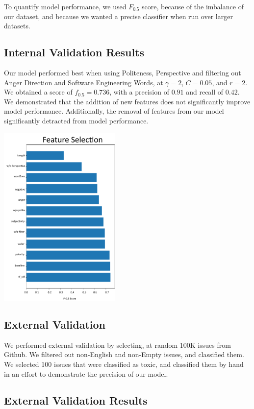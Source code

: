 \documentclass[conference]{IEEEtran}
\begin{document}
To quantify model performance, we used $F_{0.5}$ score, because of the imbalance of our dataset, and because we wanted a precise classifier when run over larger datasets. 

\subsection{Internal Validation Results} 

Our model performed best when using Politeness, Perspective and filtering out Anger Direction and Software Engineering Words, at $\gamma=2$, $C=0.05$, and $r=2$. We obtained a score of $f_{0.5}=0.736$, with a precision of $0.91$ and recall of $0.42$. We demonstrated that the addition of new features does not significantly improve model performance. Additionally, the removal of features from our model significantly detracted from model performance. 

\includegraphics[width=6cm]{feature.png}

\subsection{External Validation} 

We performed external validation by selecting, at random 100K issues from Github. We filtered out non-English and non-Empty issues, and classified them. We selected 100 issues that were classified as toxic, and classified them by hand in an effort to demonstrate the precision of our model. 

\subsection{External Validation Results} 
\end{document}
